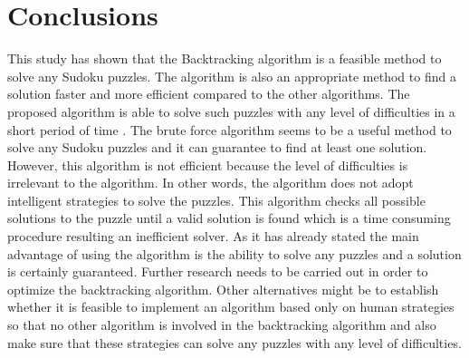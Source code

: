 \documentclass[12pt, letterpaper, twoside]{article}
\begin{document}
    \section{Conclusions}
	This study has shown that the Backtracking algorithm is a feasible method to solve any
Sudoku puzzles. The algorithm is also an appropriate method to find a solution faster and
more efficient compared to the other algorithms. The proposed algorithm is able to solve
such puzzles with any level of difficulties in a short period of time .
The brute force algorithm seems to be a useful method to solve any Sudoku puzzles and it can
guarantee to find at least one solution. However, this algorithm is not efficient because the
level of difficulties is irrelevant to the algorithm. In other words, the algorithm does not adopt
intelligent strategies to solve the puzzles. This algorithm checks all possible solutions to the
puzzle until a valid solution is found which is a time consuming procedure resulting an
inefficient solver. As it has already stated the main advantage of using the algorithm is the
ability to solve any puzzles and a solution is certainly guaranteed.
Further research needs to be carried out in order to optimize the backtracking algorithm.
Other alternatives might be to establish whether it is feasible to implement an algorithm based
only on human strategies so that no other algorithm is involved in the backtracking
algorithm and also make sure that these strategies can solve any puzzles with any level of
difficulties.  \\ \\ \\ \\ \\ \\ \\ \\ \\ \\ \\ \\ \\ \\ \\ \\ 
\end{document}
